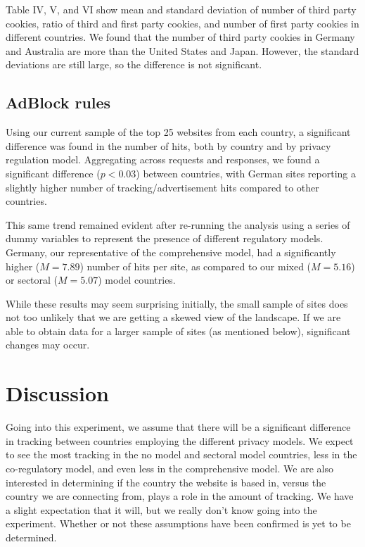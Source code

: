 \documentclass[12pt,draft,onecolumn]{IEEEtran}
\begin{document}
Table IV, V, and VI show mean and standard deviation of number of third party cookies, ratio of third and first party cookies, and number of first party cookies in different countries. We found that the number of third party cookies in Germany and Australia are more than the United States and Japan. However, the standard deviations are still large, so the difference is not significant. 

\subsection{AdBlock rules}

Using our current sample of the top 25 websites from each country, a significant difference was found in the number of hits, both by country and by privacy regulation model. Aggregating across requests and responses, we found a significant difference ($p<0.03$) between countries, with German sites reporting a slightly higher number of tracking/advertisement hits compared to other countries. 

This same trend remained evident after re-running the analysis using a series of dummy variables to represent the presence of different regulatory models. Germany, our representative of the comprehensive model, had a significantly higher ($M=7.89$) number of hits per site, as compared to our mixed ($M=5.16$) or sectoral ($M=5.07$) model countries.

While these results may seem surprising initially, the small sample of sites does not too unlikely that we are getting a skewed view of the landscape. If we are able to obtain data for a larger sample of sites (as mentioned below), significant changes may occur.

\section{Discussion}
Going into this experiment, we assume that there will be a significant difference in tracking between countries employing the different privacy models. We expect to see the most tracking in the no model and sectoral model countries, less in the co-regulatory model, and even less in the comprehensive model. We are also interested in determining if the country the website is based in, versus the country we are connecting from, plays a role in the amount of tracking. We have a slight expectation that it will, but we really don't know going into the experiment. Whether or not these assumptions have been confirmed is yet to be determined.
\end{document}
